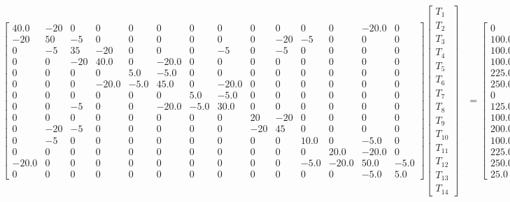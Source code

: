 \documentclass[10pt]{article}
\begin{document}
\begin{landscape}
{{\begin{align*}
\left[\begin{array}{cccccccccccccc}40.0 & -20 & 0 & 0 & 0 & 0 & 0 & 0 & 0 & 0 & 0 & 0 & -20.0 & 0\\-20 & 50 & -5 & 0 & 0 & 0 & 0 & 0 & 0 & -20 & -5 & 0 & 0 & 0\\0 & -5 & 35 & -20 & 0 & 0 & 0 & -5 & 0 & -5 & 0 & 0 & 0 & 0\\0 & 0 & -20 & 40.0 & 0 & -20.0 & 0 & 0 & 0 & 0 & 0 & 0 & 0 & 0\\0 & 0 & 0 & 0 & 5.0 & -5.0 & 0 & 0 & 0 & 0 & 0 & 0 & 0 & 0\\0 & 0 & 0 & -20.0 & -5.0 & 45.0 & 0 & -20.0 & 0 & 0 & 0 & 0 & 0 & 0\\0 & 0 & 0 & 0 & 0 & 0 & 5.0 & -5.0 & 0 & 0 & 0 & 0 & 0 & 0\\0 & 0 & -5 & 0 & 0 & -20.0 & -5.0 & 30.0 & 0 & 0 & 0 & 0 & 0 & 0\\0 & 0 & 0 & 0 & 0 & 0 & 0 & 0 & 20 & -20 & 0 & 0 & 0 & 0\\0 & -20 & -5 & 0 & 0 & 0 & 0 & 0 & -20 & 45 & 0 & 0 & 0 & 0\\0 & -5 & 0 & 0 & 0 & 0 & 0 & 0 & 0 & 0 & 10.0 & 0 & -5.0 & 0\\0 & 0 & 0 & 0 & 0 & 0 & 0 & 0 & 0 & 0 & 0 & 20.0 & -20.0 & 0\\-20.0 & 0 & 0 & 0 & 0 & 0 & 0 & 0 & 0 & 0 & -5.0 & -20.0 & 50.0 & -5.0\\0 & 0 & 0 & 0 & 0 & 0 & 0 & 0 & 0 & 0 & 0 & 0 & -5.0 & 5.0\end{array}\right] \left[\begin{matrix}T_{1}\\T_{2}\\T_{3}\\T_{4}\\T_{5}\\T_{6}\\T_{7}\\T_{8}\\T_{9}\\T_{10}\\T_{11}\\T_{12}\\T_{13}\\T_{14}\end{matrix}\right] &= \left[\begin{matrix}0\\100.0\\100.0\\100.0\\225.0\\250.0\\0\\125.0\\100.0\\200.0\\100.0\\225.0\\250.0\\25.0\end{matrix}\right]
\end{align*}
}}


\end{landscape}
\end{document}
